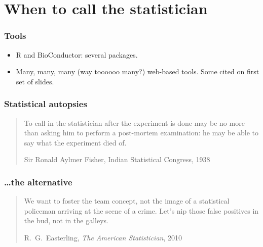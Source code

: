 \section[Help!]{When to call the statistician}

\begin{frame}
\frametitle{Tools}
\begin{itemize}
\item R and BioConductor: several packages.
\item Many, many, many (way toooooo many?) web-based tools. Some cited on
  first set of slides.
\end{itemize}
\end{frame}


\begin{frame}
  \frametitle{Statistical autopsies}
  \begin{quote}
    To call in the statistician after the experiment is done may be no more
    than asking him to perform a post-mortem examination: he may be able to
    say what the experiment died of.
    \vspace*{20pt}


    \textnormal{Sir Ronald Aylmer Fisher, Indian Statistical Congress, 1938}
  \end{quote}


\end{frame}


\begin{frame}


  \frametitle{\ldots the alternative}
  \begin{quote}
    We want to foster the team concept, not the image of a statistical
    policeman arriving at the scene of a crime. Let's nip those false
    positives in the bud, not in the galleys.
    \vspace*{20pt}


    \textnormal{R.\ G.\ Easterling, \textit{The American Statistician}, 2010}
  \end{quote}
\end{frame}


